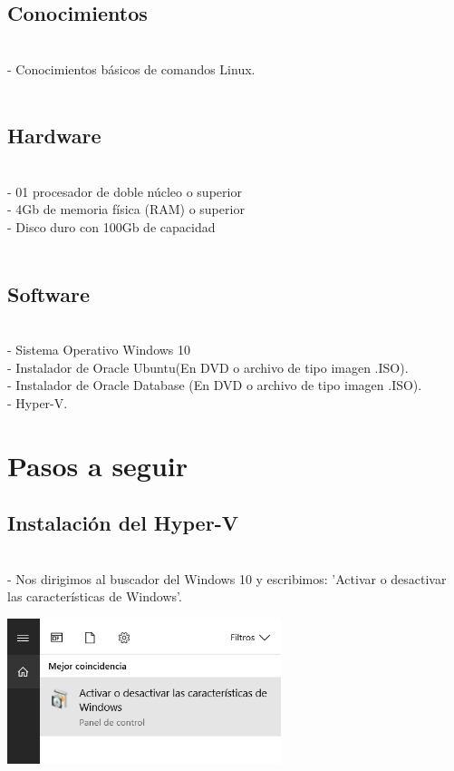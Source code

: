 \documentclass[12pt,letterpaper]{article}
\begin{document}
\begin{itemize}
\subsection{Conocimientos}\\
- Conocimientos básicos de comandos Linux.\\\\


\subsection{Hardware}\\
- 01 procesador de doble núcleo o superior\\
- 4Gb de memoria física (RAM) o superior\\
- Disco duro con 100Gb de capacidad\\\\


\subsection{Software}\\
- Sistema Operativo Windows 10\\
- Instalador de Oracle Ubuntu(En DVD o archivo de tipo imagen .ISO).\\
- Instalador de Oracle Database (En DVD o archivo de tipo imagen .ISO).\\
- Hyper-V.
\end{itemize} 


\section{Pasos a seguir}

\begin{itemize}
\subsection{Instalación del Hyper-V}\\
- Nos dirigimos al buscador del Windows 10 y escribimos: 'Activar o desactivar las características de Windows'.\\
\end{itemize}

\begin{center}
	\includegraphics[width=8cm]{./Imagenes/1} 
\end{center}
\end{document}
